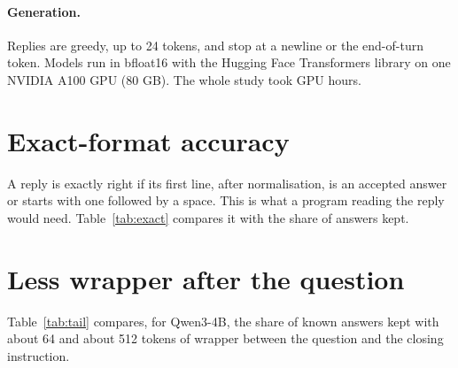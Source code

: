 \paragraph{Generation.} Replies are greedy, up to 24 tokens, and stop at a newline or the end-of-turn token. Models run in bfloat16 with the Hugging Face Transformers library on one NVIDIA A100 GPU (80 GB). The whole study took \GPUHours{} GPU hours.

\begin{table}[h]
\centering
\footnotesize
\setlength{\tabcolsep}{3pt}

\caption{\textbf{Models.} Known: items the model answers correctly in the plain prompt with probability at least 0.5, out of \NItems{}. Pairs: failed test prompts patched (Section~\ref{sec:where}).}
\label{tab:models}
\end{table}

\section{Exact-format accuracy}
\label{app:exact}
A reply is exactly right if its first line, after normalisation, is an accepted answer or starts with one followed by a space. This is what a program reading the reply would need. Table~\ref{tab:exact} compares it with the share of answers kept.

\begin{table}[h]
\centering
\footnotesize
\setlength{\tabcolsep}{3.5pt}

\caption{\textbf{Kept answers and exactly right replies}, for all four models and three lengths together, test items.}
\label{tab:exact}
\end{table}

\section{Less wrapper after the question}
\label{app:tail}
Table~\ref{tab:tail} compares, for Qwen3-4B, the share of known answers kept with about 64 and about 512 tokens of wrapper between the question and the closing instruction.

\begin{table}[h]
\centering
\footnotesize
\setlength{\tabcolsep}{3.5pt}

\caption{\textbf{Qwen3-4B: kept answers by the amount of wrapper after the question}, all three lengths together, test items.}
\label{tab:tail}
\end{table}

